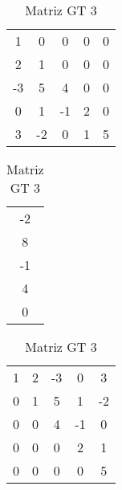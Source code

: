 \documentclass[12pt]{article}
\begin{document}
\begin{table}[!ht]
  \begin{minipage}[b]{.36\linewidth}

    \centering
    \begin{tabular}{|c c c c c|}
        1&         0 &           0             &   0     &   0   \\
        2&         1&          0               &   0     &   0   \\
        -3&         5&          4                &   0     &   0   \\
        0&         1&           -1          &   2    &     0  \\
        3&         -2&           0           &   1    &     5\\
    \end{tabular}
    \caption{Matriz G 3}
    \label{tab:dir}


  \end{minipage}\hfill
  \begin{minipage}[b]{.46\linewidth}

    \centering
    \begin{tabular}{|c|}
        -2\\
        8\\
        -1\\
        4\\
        0\\
    \end{tabular}
    \caption{Resolução Matriz 3}
    \label{tab:dir}
  \end{minipage}\hfill
  \begin{minipage}[b]{.36\linewidth}

    \centering
    \begin{tabular}{|c c c c c|}
        1           &         2               &           -3             &   0     &   3   \\
        0          &         1                &          5                &   1     &   -2   \\
        0           &         0               &          4                &   -1     &   0   \\
        0          &         0                &           0             &   2    &     1\\
        0          &         0                &           0             &   0    &    5\\
    \end{tabular}
      \caption{Matriz GT 3}
    \label{tab:esq}
  \end{minipage}

\end{table}
\end{document}

